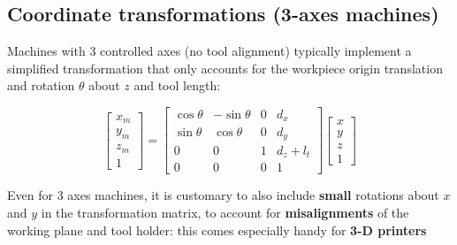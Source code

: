 \documentclass[
  letterpaper,
  DIV=11,
  numbers=noendperiod]{scrartcl}
\begin{document}
\subsection{Coordinate transformations (3-axes
machines)}\label{coordinate-transformations-3-axes-machines}

Machines with 3 controlled axes (no tool alignment) typically implement
a simplified transformation that only accounts for the workpiece origin
translation and rotation \(\theta\) about \(z\) and tool length:

\[
\begin{bmatrix} x_m \\ y_m \\ z_m \\1 \end{bmatrix} =
\begin{bmatrix} \cos\theta & -\sin\theta & 0 & d_x \\
\sin\theta & \cos\theta & 0 & d_y \\
0 & 0 & 1 & d_z + l_t \\
0 & 0 & 0 & 1 \end{bmatrix}
\begin{bmatrix} x \\ y \\ z \\ 1 \end{bmatrix}
\]

\begin{tcolorbox}[enhanced jigsaw, arc=.35mm, bottomrule=.15mm, bottomtitle=1mm, breakable, colback=white, colbacktitle=quarto-callout-tip-color!10!white, colframe=quarto-callout-tip-color-frame, coltitle=black, left=2mm, leftrule=.75mm, opacityback=0, opacitybacktitle=0.6, rightrule=.15mm, title=\textcolor{quarto-callout-tip-color}{\faLightbulb}\hspace{0.5em}{Workplane tilt compensation}, titlerule=0mm, toprule=.15mm, toptitle=1mm]

Even for 3 axes machines, it is customary to also include \textbf{small}
rotations about \(x\) and \(y\) in the transformation matrix, to account
for \textbf{misalignments} of the working plane and tool holder: this
comes especially handy for \textbf{3-D printers}

\end{tcolorbox}

\subsection{}\label{section-2}
\end{document}
